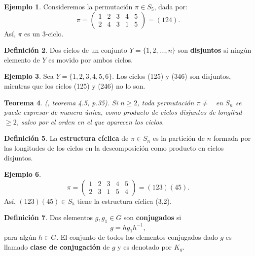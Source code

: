 \documentclass[12pt]{book}
\newtheorem{theorem}{Teorema}[section]
\theoremstyle{definition}
\newtheorem{definition}[theorem]{Definición}
\newtheorem{example}[theorem]{Ejemplo}
\DeclareMathOperator{\idn}{id_{n}}
\newcounter{in}
\newcounter{ini}
\begin{document}
\begin{example}
  Consideremos la permutación $\pi\in S_{5}$, dada por:
  \[\pi=\left(
    \begin{array}{ccccc}
      1 & 2 & 3 & 4 & 5\\
      2 & 4 & 3 & 1 & 5  
    \end{array} 
  \right)=(124).\]
  Así, $\pi$ es un 3-ciclo.
\end{example}

\begin{definition}
  Dos ciclos de un conjunto $Y=\{1,2,\dots,n\}$ son \textbf{disjuntos} si ningún elemento de
  $Y$ es movido por ambos ciclos.
\end{definition}

\begin{example}
  Sea $Y=\{1,2,3,4,5,6\}.$ Los ciclos (125) y (346) son disjuntos, mientras que los ciclos
  (125) y (246) no lo son.
\end{example}

\begin{theorem}{\normalfont (\cite{zaldivar}, teorema 4.5, p.35)}.
  Si $n\geq 2$, toda permutación $\pi\neq \idn$ en $S_{n}$ se puede
  expresar de manera única, como producto de ciclos disjuntos de
  longitud $\geq 2$, salvo por el orden en el que aparecen los ciclos.
\end{theorem}

\begin{definition}
  La \textbf{estructura cíclica} de $\pi\in S_{n}$ es la partición de
  $n$ formada por las longitudes de los ciclos en la descomposición
  como producto en ciclos disjuntos.
\end{definition}

\begin{example}
  \[\pi=\left(
    \begin{array}{ccccc}
      1 & 2 & 3 & 4 & 5\\
      2 & 3 & 1 & 5 & 4  
    \end{array} 
  \right)=(123)(45).\]
  Así, $(123)(45)\in S_{5}$ tiene la estructura cíclica (3,2). 
\end{example}


\begin{definition}
  Dos elementos $g,g_{1}\in G$ son \textbf{conjugados} si
  \begin{equation*}
  g=hg_{1}h^{-1},
\end{equation*}
para algún $h\in G$. El conjunto de todos los elementos conjugados
dado $g$ es llamado \textbf{clase de conjugación} de $g$ y es
denotado por $K_{g}$.
\end{definition}
\end{document}
